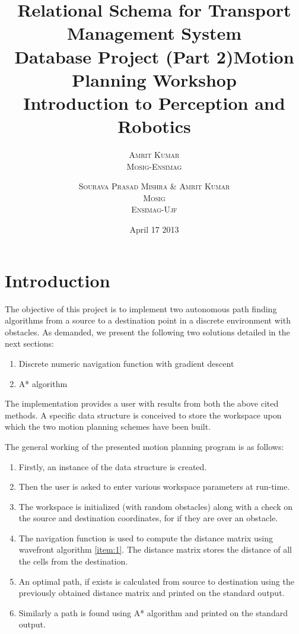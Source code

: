 \documentclass[12pt]{article}
\title{Relational Schema for Transport Management System \\ Database
  Project (Part 2)}
\author{\textsc{Amrit Kumar} 
  \\ \textsc{Mosig}-\textsc{Ensimag} }
\title{Motion Planning Workshop \\ Introduction to Perception and Robotics}
\author{\textsc{Sourava Prasad Mishra} \& \textsc{Amrit Kumar}
  \\ \textsc{Mosig} \\ \textsc{Ensimag-Ujf}  }
\date{April 17 2013}
\begin{document}
\maketitle

\section{Introduction}

	The objective of this project is to implement two autonomous path
  finding algorithms from a source to a destination point in a
  discrete environment with obstacles. As demanded, we present the
  following two solutions detailed in the next sections:

  \begin{enumerate}
	\item Discrete numeric navigation function with gradient descent
	\item A* algorithm
	\end{enumerate}

The implementation provides a user with results from both the above
cited methods. A specific data structure is conceived to store the
workspace upon which the two motion planning schemes have been built.

The general working of the presented motion planning program is as follows:
	\begin{enumerate}
	\item Firstly, an instance of the data structure is created.
	\item Then the user is asked to enter various workspace parameters
    at run-time. 
	\item The workspace is initialized (with random obstacles) along with a check on the source and destination coordinates, for if they are over an obstacle.
	\item The navigation function is used to compute the distance
    matrix using \textsf{wavefront algorithm} \ref{item:1}. The distance matrix
    stores the distance of all the cells from the destination.
	\item An optimal path, if exists is calculated from source to
    destination using the previously obtained distance matrix and printed
    on the standard output.
	\item Similarly a path is found using A* algorithm and printed on the standard output.
	\end{enumerate}
\end{document}

